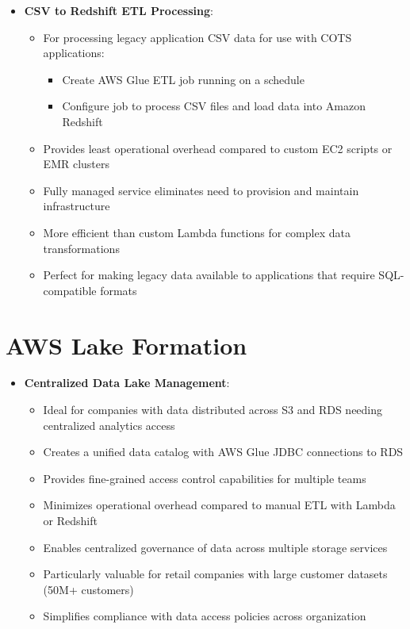 \documentclass[11pt,a4paper]{report}
\begin{document}
\begin{itemize}
\begin{itemize}
  \item Provides the least operational overhead compared to custom EC2 scripts, EMR clusters, or Lambda functions
  \item Perfect for integrating legacy applications that can't be modified with modern analytics platforms
  \item Particularly valuable when source data format can't be changed but must be analyzed with COTS applications
\end{itemize}
  \item \textbf{CSV to Redshift ETL Processing}:
\begin{itemize}
  \item For processing legacy application CSV data for use with COTS applications:
\begin{itemize}
  \item Create AWS Glue ETL job running on a schedule
  \item Configure job to process CSV files and load data into Amazon Redshift
\end{itemize}
  \item Provides least operational overhead compared to custom EC2 scripts or EMR clusters
  \item Fully managed service eliminates need to provision and maintain infrastructure
  \item More efficient than custom Lambda functions for complex data transformations
  \item Perfect for making legacy data available to applications that require SQL-compatible formats
\end{itemize}
\end{itemize}


\section{AWS Lake Formation}

\begin{itemize}
  \item \textbf{Centralized Data Lake Management}:
\begin{itemize}
  \item Ideal for companies with data distributed across S3 and RDS needing centralized analytics access
  \item Creates a unified data catalog with AWS Glue JDBC connections to RDS
  \item Provides fine-grained access control capabilities for multiple teams
  \item Minimizes operational overhead compared to manual ETL with Lambda or Redshift
  \item Enables centralized governance of data across multiple storage services
  \item Particularly valuable for retail companies with large customer datasets (50M+ customers)
  \item Simplifies compliance with data access policies across organization
\end{itemize}
\end{itemize}
\end{document}
